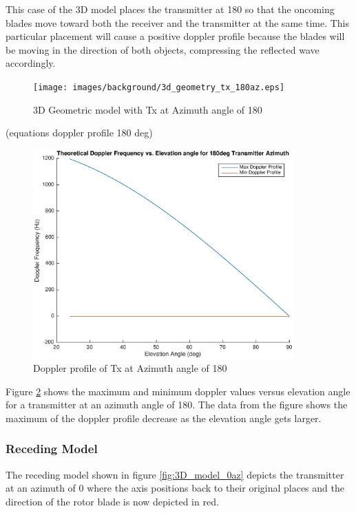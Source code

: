 This case of the 3D model places the transmitter at 180 \textdegree \space so that the oncoming blades move toward both the receiver and the transmitter at the same time. This particular placement will cause a positive doppler profile because the blades will be moving in the direction of both objects, compressing the reflected wave accordingly.

\begin{figure}
	\begin{center}
		\texttt{[image: images/background/3d\_geometry\_tx\_180az.eps]}
		\caption{3D Geometric model with Tx at Azimuth angle of 180\textdegree}
		\label{fig:3D_model_180az}
	\end{center}
\end{figure}

(equations doppler profile 180 deg)

\begin{figure}
	\begin{center}
		\includegraphics[width=10cm]{images/background/3d_geometry_tx_180az_doppler_profile.eps}
		\caption{Doppler profile of Tx at Azimuth angle of 180\textdegree}
		\label{fig:3D_model_180az_doppler}
	\end{center}
\end{figure}

Figure \ref{fig:3D_model_180az_doppler} shows the maximum and minimum doppler values versus elevation angle for a transmitter at an azimuth angle of 180\textdegree. The data from the figure shows the maximum of the doppler profile decrease as the elevation angle gets larger.

\subsubsection{Receding Model}
The receding model shown in figure \ref{fig:3D_model_0az} depicts the transmitter at an azimuth of 0 \textdegree \space where the axis positions back to their original places and the direction of the rotor blade is now depicted in red.

